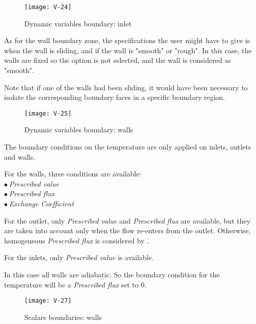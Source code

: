 \begin{figure}[ht]
\begin{center}
\texttt{[image: V-24]}
\caption{Dynamic variables boundary: inlet}
\label{fig27_e1}
\end{center}
\end{figure}


\clearpage
As for the wall boundary zone, the specifications the user might have to
give is when the wall is sliding, and if the wall is "smooth" or "rough". In this case, the walls are fixed so the
option is not selected, and the wall is considered as "smooth".

Note that if one of the walls had been sliding, it would have been necessary to
isolate the corresponding boundary faces in a specific boundary region.

\begin{figure}[ht]
\begin{center}
\texttt{[image: V-25]}
\caption{Dynamic variables boundary: walls}
\label{fig28_e1}
\end{center}
\end{figure}


\clearpage
The boundary conditions
on the temperature are only applied on inlets, outlets and walls.

For the walls, three conditions are available:\\
\hspace*{1cm}$\bullet\ ${\itshape Prescribed value}\\
\hspace*{1cm}$\bullet\ ${\itshape Prescribed flux}\\
\hspace*{1cm}$\bullet\ ${\itshape Exchange Coefficient}

For the outlet, only {\itshape Prescribed value} and {\itshape Prescribed flux} are available, but they are
taken into account only when the flow re-enters from the outlet. Otherwise,
homogeneous {\itshape Prescribed flux} is considered by \CS.

For the inlets, only {\itshape Prescribed value} is available.

In this case all walls are adiabatic. So the boundary condition for the
temperature will be a {\itshape Prescribed flux} set to 0.
\begin{figure}[ht]
\begin{center}
\texttt{[image: V-27]}
\caption{Scalars boundaries: walls}
\label{fig30_e1}
\end{center}
\end{figure}


